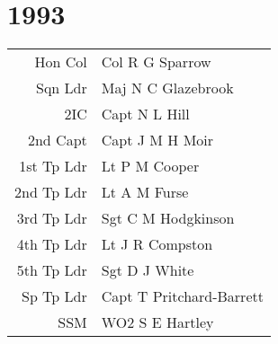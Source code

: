 \chapter*{1993}

\vspace*{10mm}

\begin{center}
  \begin{tabular}{rl}
    Hon Col & Col R G Sparrow \\
    Sqn Ldr & Maj N C Glazebrook \\
    2IC & Capt N L Hill \\
    2nd Capt & Capt J M H Moir \\
    1st Tp Ldr & Lt P M Cooper \\
    2nd Tp Ldr & Lt A M Furse \\
    3rd Tp Ldr & Sgt C M Hodgkinson \\
    4th Tp Ldr & Lt J R Compston \\
    5th Tp Ldr & Sgt D J White \\
    Sp Tp Ldr & Capt T Pritchard-Barrett \\
    SSM & WO2 S E Hartley \\
  \end{tabular}
\end{center}

\vspace*{10mm}


